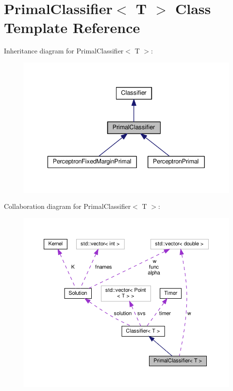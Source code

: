 \hypertarget{class_primal_classifier}{}\section{Primal\+Classifier$<$ T $>$ Class Template Reference}
\label{class_primal_classifier}


Inheritance diagram for Primal\+Classifier$<$ T $>$\+:
\nopagebreak
\begin{figure}[H]
\begin{center}
\leavevmode
\includegraphics[width=350pt]{class_primal_classifier__inherit__graph}
\end{center}
\end{figure}


Collaboration diagram for Primal\+Classifier$<$ T $>$\+:
\nopagebreak
\begin{figure}[H]
\begin{center}
\leavevmode
\includegraphics[width=350pt]{class_primal_classifier__coll__graph}
\end{center}
\end{figure}
